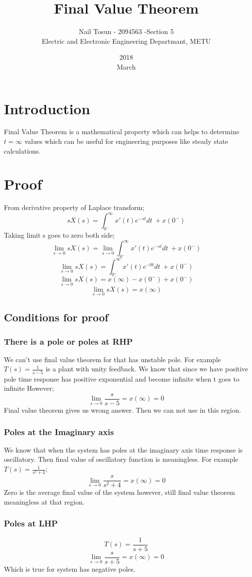 \documentclass[11pt]{article}
\title{Final Value Theorem}
\date{2018\\ March}
\author{Nail Tosun - 2094563 -Section 5\\ Electric and Electronic Engineering Departmant, METU}
\begin{document}
\maketitle
\section*{Introduction}
Final Value Theorem is a mathematical property which can helps to determine $t=\infty$ values which can be useful for engineering purposes like steady state calculations.
\section*{Proof}
From derivative property of Laplace transform;
$$sX(s)=\int_{0^{-}}^{\infty}x'(t)e^{-st}dt \> + x(0^-) $$
Taking limit s goes to zero both side;
$$ \lim_{s\to 0} sX(s)=\lim_{s\to 0}\int_{0^-}^{\infty}x'(t)e^{-st}dt \> + x(0^-)$$
$$ \lim_{s\to 0} sX(s)=\int_{0^-}^{\infty}x'(t)e^{-0t}dt \> + x(0^-)$$
$$ \lim_{s\to 0} sX(s)=x(\infty)-x(0^-)+x(0^-)$$
$$ \lim_{s\to 0} sX(s)=x(\infty)$$
\subsection*{Conditions for proof}
\subsubsection*{There is a pole or poles at RHP}
We can't use final value theorem for that has unstable pole. For example $T(s)=\frac{1}{s-5}$ is a plant with unity feedback. We know that since we have positive pole time response has positive exponential and become infinite when t goes to infinite However;
$$\lim_{s\to 0}\frac{s}{s-5}=x(\infty)=0$$
Final value theorem gives us wrong answer. Then we can not use in this region.
\subsubsection*{Poles at the Imaginary axis}
We know that when the system has poles at the imaginary axis time response is oscillatory. Then final value of oscillatory function is meaningless. For example $T(s)=\frac{1}{s^2+4}$; 
$$\lim_{s\to 0}\frac{s}{s^2+4}=x(\infty)=0$$
Zero is the average final value of the system however, still final value theorem meaningless at that region. 
\subsubsection*{Poles at LHP}
$$T(s)=\frac{1}{s+5}$$
$$\lim_{s\to 0}\frac{s}{s+5}=x(\infty)=0$$
Which is true for system has negative poles. 
\end{document}
